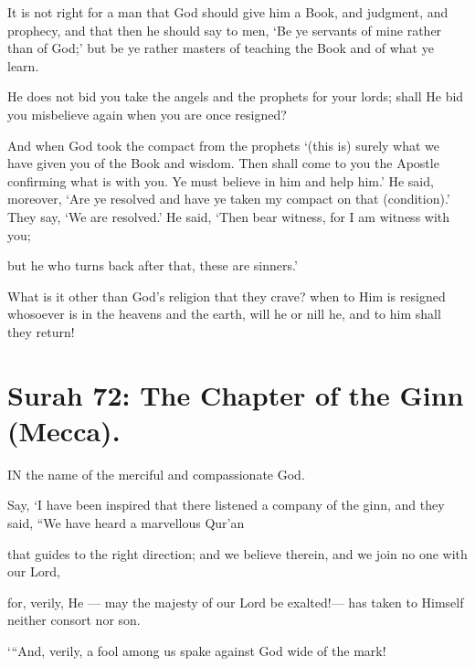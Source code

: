 \documentclass[fontsize=14pt, letterpaper, notitlepage, openany, DIV=12]{scrbook} %
\begin{document}
\noindent[3:79]
It is not right for a man that God should give him a Book, and judgment, and prophecy,
and that then he should say to men, `Be ye servants of mine rather than of God;' but be ye rather
masters of teaching the Book and of what ye learn.

\noindent[3:80]
He does not bid you take the angels and the prophets for your lords; shall He bid you
misbelieve again when you are once resigned?

\noindent[3:81]
And when God took the compact from the prophets `(this is) surely what we have given
you of the Book and wisdom. Then shall come to you the Apostle confirming what is with you.
Ye must believe in him and help him.' He said, moreover, `Are ye resolved and have ye taken
my compact on that (condition).' They say, `We are resolved.' He said, `Then bear witness, for I
am witness with you;

\noindent[3:82]
but he who turns back after that, these are sinners.'

\noindent[3:83]
What is it other than God's religion that they crave? when to Him is resigned whosoever
is in the heavens and the earth, will he or nill he, and to him shall they return!


\section{Surah 72: The Chapter of the Ginn (Mecca).}


IN the name of the merciful and compassionate God.

\noindent[72:1]
Say, `I have been inspired that there listened a company of the ginn, and they said, ``We
have heard a marvellous Qur'an

\noindent[72:2]
that guides to the right direction; and we believe therein, and we join no one with our
Lord,

\noindent[72:3]
for, verily, He --- may the majesty of our Lord be exalted!--- has taken to Himself neither
consort nor son.

\noindent[72:4]
`\hspace{0.1em}``And, verily, a fool among us spake against God wide of the mark!
\end{document}
